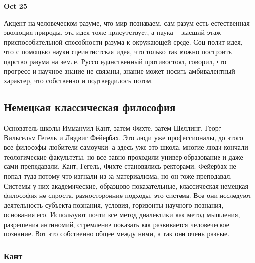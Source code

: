 \documentclass[a4paper, 12pt]{article}
\begin{document}
\hfill\textbf{Oct 25}

Акцент на человеческом разуме, что мир познаваем, сам разум есть 
естественная эволюция природы, эта идея тоже присутствует, а наука -- 
высший этаж приспособительной способности разума к окружающей среде. Соц 
полит идея, что с помощью науки сцеинтистская идея, что только так можно 
построить царство разума на земле. Руссо единственный противостоял, 
говорил, что прогресс и научное знание не связаны, знание может носить 
амбивалентный характер, что собственно и подтвердилось потом.

\subsection{Немецкая классическая философия}

Основатель школы Иммануил Кант, затем Фихте, затем Шеллинг, Георг 
Вильгельм Гегель и Людвиг Фейербах. Это люди уже профессионалы, до этого 
все философы любители самоучки, а здесь уже это школа, многие люди 
кончали теологические факультеты, но все равно проходили универ 
образование и даже сами преподавали. Кант, Гегель, Фихте становились 
ректорами. Фейербах не попал туда потому что изгнали из-за материализма, 
но он тоже преподавал. Системы у них академические, 
образцово-показательные, классическая немецкая философия не спроста, 
разносторонние подходы, это система. Все они исследуют деятельность 
субъекта познания, условия, горизонты научного познания, основания его. 
Используют почти все метод диалектики как метод мышления, разрешения 
антиномий, стремление показать как развивается человеческое познание. 
Вот это собственно общее между ними, а так они очень разные.

\subsubsection{Кант}
\end{document}
